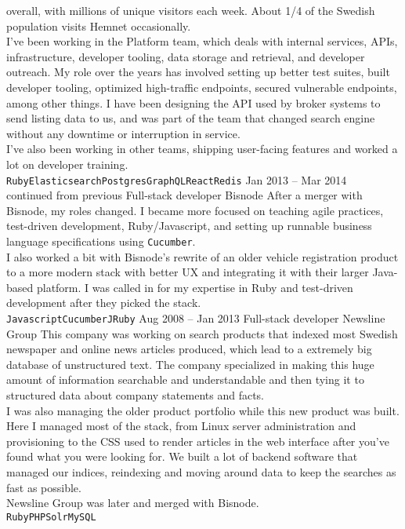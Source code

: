 \documentclass[9pt]{developercv} %
\begin{document}
\begin{entrylist}
{      overall, with millions of unique visitors each week. About 1/4 of the
      Swedish population visits Hemnet occasionally.\\ I've been working in the
      Platform team, which deals with internal services, APIs, infrastructure,
      developer tooling, data storage and retrieval, and developer outreach. My
      role over the years has involved setting up better test suites, built
      developer tooling, optimized high-traffic endpoints, secured vulnerable
      endpoints, among other things. I have been designing the API used by
      broker systems to send listing data to us, and was part of the team that
      changed search engine without any downtime or interruption in service.\\
      I've also been working in other teams, shipping user-facing features and
      worked a lot on developer training.\\
      \texttt{Ruby}\slashsep\texttt{Elasticsearch}\slashsep\texttt{Postgres}\slashsep\texttt{GraphQL}\slashsep\texttt{React}\slashsep\texttt{Redis}}
  \entry
    {Jan 2013 -- Mar 2014\\\footnotesize{continued from previous}}
    {Full-stack developer}
    {Bisnode}
    {After a merger with Bisnode, my roles changed. I became more focused on
      teaching agile practices, test-driven development, Ruby/Javascript, and
      setting up runnable business language specifications using
      \texttt{Cucumber}.\\ I also worked a bit with Bisnode's rewrite of an
      older vehicle registration product to a more modern stack with better
      UX and integrating it with their larger Java-based platform. I was called
      in for my expertise in Ruby and test-driven development after they picked
      the stack.\\
      \texttt{Javascript}\slashsep\texttt{Cucumber}\slashsep\texttt{JRuby}}
  \entry
    {Aug 2008 -- Jan 2013}
    {Full-stack developer}
    {Newsline Group}
    {This company was working on search products that indexed most Swedish
      newspaper and online news articles produced, which lead to a extremely
      big database of unstructured text. The company specialized in making this
      huge amount of information searchable and understandable and then tying
      it to structured data about company statements and facts.\\ I was also
      managing the older product portfolio while this new product was built.\\
      Here I managed most of the stack, from Linux server administration and
      provisioning to the CSS used to render articles in the web interface
      after you've found what you were looking for. We built a lot of backend
      software that managed our indices, reindexing and moving around data to
      keep the searches as fast as possible.\\ Newsline Group was later and
      merged with Bisnode.\\
      \texttt{Ruby}\slashsep\texttt{PHP}\slashsep\texttt{Solr}\slashsep\texttt{MySQL}}
\end{entrylist}
\end{document}
